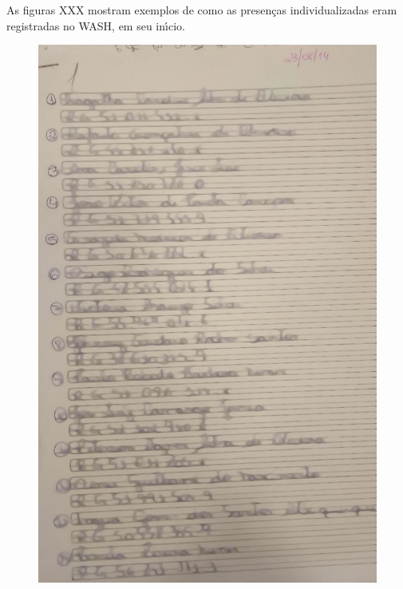 \documentclass[
12pt,		%
openright,	%
twoside,  %
a4paper,			%
chapter=TITLE,		%
english,			%
french,				%
spanish,			%
brazil				%
]{USPSC-classe/USPSC}
\begin{document}
As figuras XXX mostram exemplos de como as presen\c{c}as individualizadas eram registradas no WASH, em seu in\'{\i}cio.












\captionsetup{format=plain}
\begin{figure}[max size={\textwidth}{\textheight}]

\centering


\begin{minipage}[b]{0.4\linewidth}
        \centering
                \includegraphics[width=1.0\linewidth]{../../imagens/blurred-Presenca-Oficina-2014-08-23.jpeg}

\end{minipage}
\end{figure}
\end{document}
